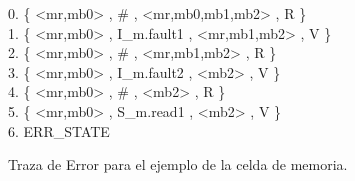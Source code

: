 \begin{figure}[t]
\centering
\begin{minipage}[t]{.47\textwidth}
\fontsize{10}{10}\selectfont\ttfamily
\begin{tabbing}
0. \{ <mr,mb0> , \# , <mr,mb0,mb1,mb2> , R \} \\ 
1. \{ <mr,mb0> , I\_m.fault1 , <mr,mb1,mb2> , V \} \\ 
2. \{ <mr,mb0> , \# , <mr,mb1,mb2> , R \} \\ 
3. \{ <mr,mb0> , I\_m.fault2 , <mb2> , V \} \\ 
4. \{ <mr,mb0> , \# , <mb2> , R \} \\ 
5. \{ <mr,mb0> , S\_m.read1 , <mb2> , V \} \\ 
6. ERR\_STATE \\ 
\end{tabbing}
\end{minipage}
\caption{Traza de Error para el ejemplo de la celda de memoria.} \label{fig:trace_mem_cell}
\end{figure}






